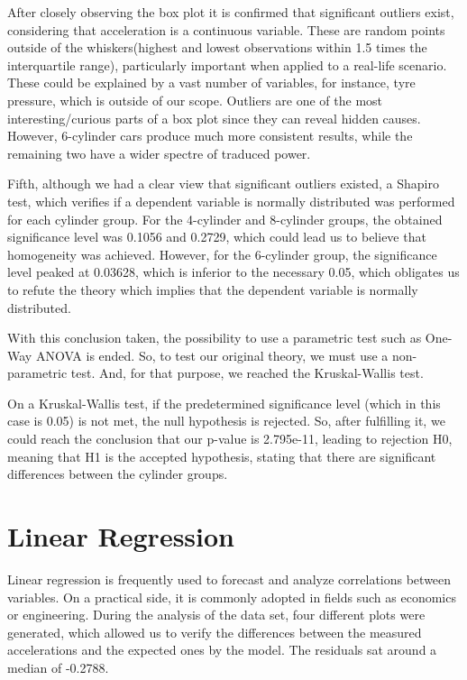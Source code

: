 \documentclass[conference]{IEEEtran}
\begin{document}
After closely observing the box plot it is confirmed that significant outliers exist, considering that acceleration is a continuous variable.
These are random points outside of the whiskers(highest and lowest observations within 1.5 times the interquartile range), particularly important when applied to a real-life scenario.
These could be explained by a vast number of variables, for instance, tyre pressure, which is outside of our scope.
Outliers are one of the most interesting/curious parts of a box plot since they can reveal hidden causes.\\

However, 6-cylinder cars produce much more consistent results, while the remaining two have a wider spectre of traduced power.

Fifth, although we had a clear view that significant outliers existed, a Shapiro test, which verifies if a dependent variable is normally distributed was performed for each cylinder group.
For the 4-cylinder and 8-cylinder groups, the obtained significance level was 0.1056 and 0.2729, which could lead us to believe that homogeneity was achieved.
However, for the 6-cylinder group, the significance level peaked at 0.03628, which is inferior to the necessary 0.05, 
which obligates us to refute the theory which implies that the dependent variable is normally distributed.

With this conclusion taken, the possibility to use a parametric test such as One-Way ANOVA is ended. So, to test our original theory, we must use a 
non-parametric test. And, for that purpose, we reached the Kruskal-Wallis test.

On a Kruskal-Wallis test, if the predetermined significance level (which in this case is 0.05) is not met, the null hypothesis is rejected.
So, after fulfilling it, we could reach the conclusion that our p-value is 2.795e-11, leading to rejection H0, meaning that H1 is the accepted hypothesis, 
stating that there are significant differences between the cylinder groups.

\section{Linear Regression}

Linear regression is frequently used to forecast and analyze correlations between variables. On a practical side, it is commonly adopted in fields such as economics or engineering.
During the analysis of the data set, four different plots were generated, which allowed us to verify the differences between the measured accelerations and the expected ones by the model.
The residuals sat around a median of -0.2788.
\end{document}
